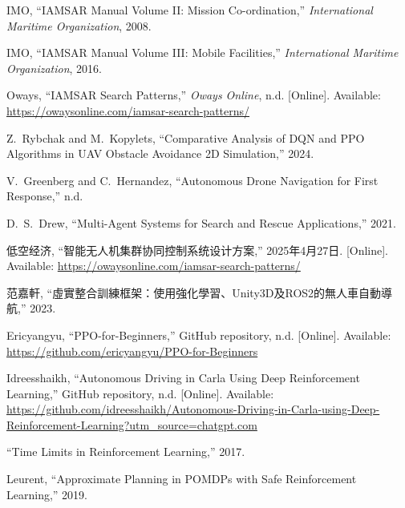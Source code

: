 \documentclass[12pt,a4paper]{article}
\begin{document}
\begin{thebibliography}{9}

IMO,
``IAMSAR Manual Volume II: Mission Co-ordination,''
\textit{International Maritime Organization},
2008.

IMO,
``IAMSAR Manual Volume III: Mobile Facilities,''
\textit{International Maritime Organization},
2016.

Oways,
``IAMSAR Search Patterns,''
\textit{Oways Online},
n.d.
[Online]. Available: \url{https://owaysonline.com/iamsar-search-patterns/}

Z.~Rybchak and M.~Kopylets,
``Comparative Analysis of DQN and PPO Algorithms in UAV Obstacle Avoidance 2D Simulation,''
2024.

V.~Greenberg and C.~Hernandez,
``Autonomous Drone Navigation for First Response,''
n.d.

D.~S.~Drew,
``Multi-Agent Systems for Search and Rescue Applications,''
2021.

低空经济,
``智能无人机集群协同控制系统设计方案,''
2025年4月27日.
[Online]. Available: \url{https://owaysonline.com/iamsar-search-patterns/}

范嘉軒,
``虛實整合訓練框架：使用強化學習、Unity3D及ROS2的無人車自動導航,''
2023.

Ericyangyu,
``PPO-for-Beginners,''
GitHub repository,
n.d.
[Online]. Available: \url{https://github.com/ericyangyu/PPO-for-Beginners}


Idreesshaikh,
``Autonomous Driving in Carla Using Deep Reinforcement Learning,''
GitHub repository,
n.d.
[Online]. Available: \url{https://github.com/idreesshaikh/Autonomous-Driving-in-Carla-using-Deep-Reinforcement-Learning?utm\_source=chatgpt.com}


``Time Limits in Reinforcement Learning,''
2017.

Leurent,
``Approximate Planning in POMDPs with Safe Reinforcement Learning,''
2019.

\end{thebibliography}
\end{document}
